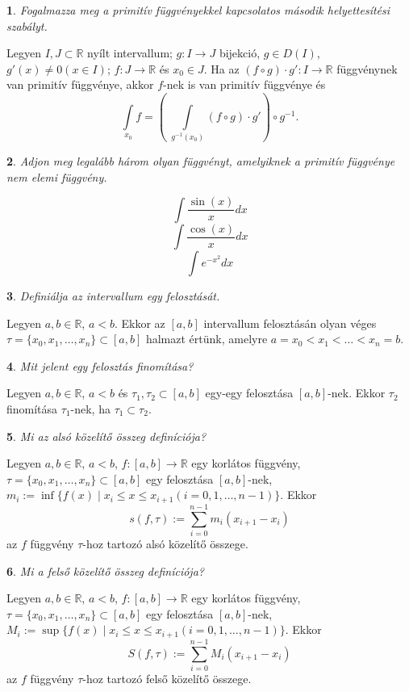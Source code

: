 \documentclass[a4paper]{article}
\def\R{\mathbb{R}}
\theoremstyle{qstyle}
\newtheorem{question}{}{}
\begin{document}
	\begin{question}
		Fogalmazza meg a primitív függvényekkel kapcsolatos \emph{második helyettesítési szabályt}.
	\end{question}
	Legyen $I,J \subset \R$ nyílt intervallum; $g : I \to J$ bijekció, $g \in D(I)$, $g'(x) \neq 0 (x \in I)$; $f : J \to \R$ és $x_0 \in J$. Ha az $(f \circ g) \cdot g' : I \to \R$ függvénynek van primitív függvénye, akkor $f$-nek is van primitív függvénye és
	$$\int\limits_{x_0} f = \left(\; \int\limits_{g^{-1}(x_0)} (f \circ g) \cdot g' \right) \circ g^{-1} \text{.} $$
	
	\begin{question}
		Adjon meg legalább három olyan függvényt, amelyiknek a primitív függvénye nem elemi függvény.
	\end{question}
	$$\int \frac{\sin(x)}{x} dx $$
	$$\int \frac{\cos(x)}{x} dx $$
	$$\int e^{-x^2} dx $$
	
	\begin{question}
		Definiálja az intervallum egy felosztását.
	\end{question}
	Legyen $a,b \in \R$, $a < b$. Ekkor az $[a,b]$ intervallum felosztásán olyan véges $\tau = \{x_0, x_1, \dots, x_n \} \subset [a,b]$ halmazt értünk, amelyre $a = x_0 < x_1 < \dots < x_n = b$.
	
	\begin{question}
		Mit jelent egy felosztás finomítása?
	\end{question}
	Legyen $a,b \in \R$, $a < b$ és $\tau_1, \tau_2 \subset [a,b]$ egy-egy felosztása $[a,b]$-nek. Ekkor $\tau_2$ finomítása $\tau_1$-nek, ha $\tau_1 \subset \tau_2$.
	
	\begin{question}
		Mi az alsó közelítő összeg definíciója?
	\end{question}
	Legyen $a,b \in \R$, $a < b$, $f : [a,b] \to \R$ egy korlátos függvény, $\tau = \{x_0,x_1,\dots,x_n \} \subset [a,b]$ egy felosztása $[a,b]$-nek, $m_i := \inf\{f(x) \mid x_i \leq x \leq x_{i+1} (i = 0, 1, \dots, n-1) \}$. Ekkor
	$$s(f,\tau) := \sum_{i=0}^{n-1} m_i(x_{i+1}-x_i) $$
	az $f$ függvény $\tau$-hoz tartozó alsó közelítő összege.
	
	\begin{question}
		Mi a felső közelítő összeg definíciója?
	\end{question}
	Legyen $a,b \in \R$, $a < b$, $f : [a,b] \to \R$ egy korlátos függvény, $\tau = \{x_0,x_1,\dots,x_n \} \subset [a,b]$ egy felosztása $[a,b]$-nek, $M_i := \sup \{f(x) \mid x_i \leq x \leq x_{i+1} (i = 0, 1, \dots, n-1) \}$. Ekkor
	\[S(f,\tau) := \sum_{i=0}^{n-1} M_i(x_{i+1}-x_i) \]
	az $f$ függvény $\tau$-hoz tartozó felső közelítő összege.
	
\end{document}
